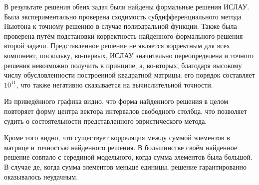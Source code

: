 В результате решения обеих задач были найдены формальные решения ИСЛАУ. Была экспериментально проверена сходимость субдифференциального метода Ньютона к точному решению в случае полиэдральной функции. Также была проверена путём подстановки корректность найденного формального решения второй задачи. Представленное решение не является корректным для всех компонент, поскольку, во-первых, ИСЛАУ значительно переопределена и точного решения невозможно получить в принципе, а, во-вторых, благодаря высокому числу обусловленности построенной квадратной матрицы: его порядок составляет $10^{11}$, что также негативно сказывается на вычислительной точности.

Из приведённого графика видно, что форма найденного решения в целом повторяет форму центра вектора интервалов свободного столбца, что позволяет судить о состоятельности представленного эвристического метода.

Кроме того видно, что существует корреляция между суммой элементов в матрице и точностью найденного решения. В большинстве своём найденное решение совпало с серединой модельного, когда сумма элементов была большой. В случае де, когда сумма элементов меньше единицы, решение гарантированно оказывалось неудачным.